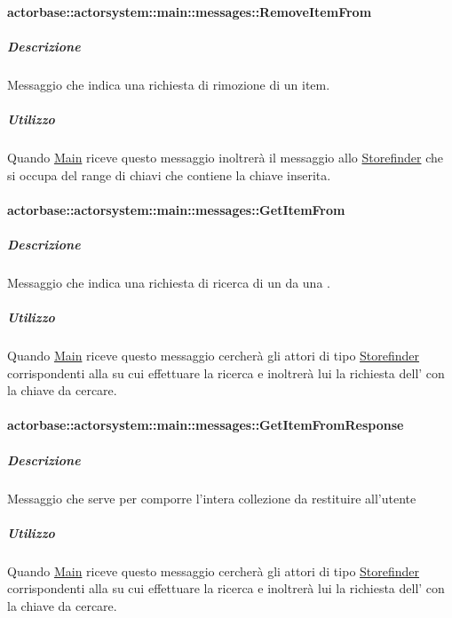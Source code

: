 \documentclass{scalatekids-article}
\begin{document}
\paragraph{actorbase::actorsystem::main::messages::RemoveItemFrom}
\label{sec:actorbase::actorsystem::main::messages::RemoveItemFrom}

\subparagraph{Descrizione}
Messaggio che indica una richiesta di rimozione di un item.

\subparagraph{Utilizzo}
Quando \hyperref[sec:actorbase::actorsystem::main::Main]{Main}
riceve questo messaggio inoltrerà il messaggio allo \hyperref[sec:actorbase::actorsystem::storefinder::Storefinder]{Storefinder}
che si occupa del range di chiavi che contiene la chiave inserita.

\paragraph{actorbase::actorsystem::main::messages::GetItemFrom}
\label{sec:actorbase::actorsystem::main::messages::GetItemFrom}

\subparagraph{Descrizione}

Messaggio che indica una richiesta di ricerca di un  da una .

\subparagraph{Utilizzo}

Quando \hyperref[sec:actorbase::actorsystem::main::Main]{Main}
riceve questo messaggio cercherà gli attori di tipo
\hyperref[sec:actorbase::actorsystem::storefinder::Storefinder]{Storefinder}
corrispondenti alla  su cui effettuare la ricerca
e inoltrerà lui la richiesta dell' con la chiave da cercare.

\paragraph{actorbase::actorsystem::main::messages::GetItemFromResponse}
\label{sec:actorbase::actorsystem::main::messages::GetItemFromResponse}

\subparagraph{Descrizione}

Messaggio che serve per comporre l'intera collezione da restituire all'utente

\subparagraph{Utilizzo}

Quando \hyperref[sec:actorbase::actorsystem::main::Main]{Main}
riceve questo messaggio cercherà gli attori di tipo
\hyperref[sec:actorbase::actorsystem::storefinder::Storefinder]{Storefinder}
corrispondenti alla  su cui effettuare la ricerca
e inoltrerà lui la richiesta dell' con la chiave da cercare.
\end{document}
